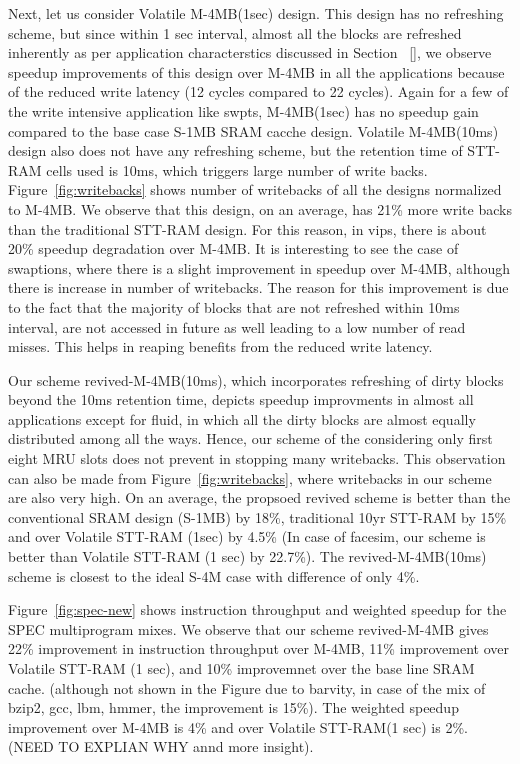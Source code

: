 Next, let us consider Volatile M-4MB(1sec) design. This design has no refreshing scheme, but since within 1 sec interval,
almost all the blocks are refreshed inherently as per application characterstics discussed in Section ~\ref{},
we observe speedup improvements of this design over M-4MB in all the applications because of the reduced
write latency (12 cycles compared to 22 cycles). 
Again for a few of the write intensive application like swpts, M-4MB(1sec) has no speedup gain compared to
the base case S-1MB SRAM cacche design.
Volatile M-4MB(10ms) design also does not have any refreshing scheme, but the retention time of STT-RAM
cells used is 10ms, which triggers large number of write backs. 
Figure~\ref{fig:writebacks} shows number of writebacks of all the designs normalized to M-4MB.
We observe that this design, on an average, has 21\% more 
write backs than the traditional STT-RAM design.
For this reason, in vips, there is about 20\% speedup degradation over M-4MB.
It is interesting to see the case of swaptions, where there is a slight improvement in speedup over M-4MB, although 
there is increase in number of writebacks. The reason for this improvement is due to the fact that 
the majority of blocks that are not refreshed within 10ms interval, 
are not accessed in future as well leading to a low number of read misses.
This helps in reaping benefits from the reduced write latency.  

Our scheme revived-M-4MB(10ms), which incorporates refreshing of dirty blocks beyond the 10ms retention time,
depicts speedup improvments
in almost all applications except for fluid, in which all the dirty blocks are almost equally distributed among
all the ways. Hence, our scheme of the considering only first eight MRU slots does not prevent in stopping 
many writebacks. This observation can also be made from Figure~\ref{fig:writebacks}, where writebacks in our scheme are also
very high. On an average,  the propsoed revived scheme is better than the conventional SRAM design (S-1MB) by 18\%,
traditional 10yr STT-RAM by 15\% and over Volatile STT-RAM (1sec) 
by 4.5\% (In case of facesim, our scheme is better than Volatile STT-RAM (1 sec) by 22.7\%). 
The revived-M-4MB(10ms) scheme is closest to the ideal S-4M case with difference of only 4\%.

Figure~\ref{fig:spec-new} shows instruction throughput and weighted speedup for the  SPEC multiprogram
mixes. We observe that our scheme revived-M-4MB gives 22\% improvement in instruction throughput 
over M-4MB, 11\% improvement over Volatile STT-RAM (1 sec), and 10\% improvemnet over
the base line SRAM cache. (although not shown in the Figure due to barvity, in case of the mix of
bzip2, gcc, lbm, hmmer, the improvement is 15\%). The weighted speedup improvement over M-4MB is 4\% 
and over Volatile STT-RAM(1 sec) is 2\%. (NEED TO EXPLIAN WHY annd more insight).



